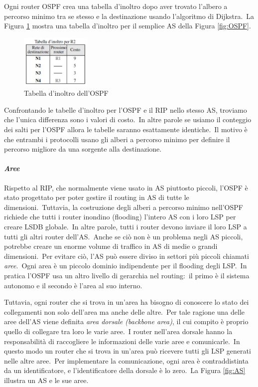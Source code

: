 Ogni router OSPF crea una tabella d'inoltro dopo aver trovato l'albero a percorso minimo tra se stesso e la destinazione usando l'algoritmo di Dijkstra.\
La Figura \ref{fig:Tabella_OSPF} mostra una tabella d'inoltro per il semplice AS della Figura \ref{fig:OSPF}.
\begin{figure}[H]
    \centering
    \includegraphics[width=0.3\textwidth]{immagini/Tabelle_inoltro_OSPF.jpg}
    \caption{Tabella d'inoltro dell'OSPF}
    \label{fig:Tabella_OSPF}
\end{figure}
Confrontando le tabelle d'inoltro per l'OSPF e il RIP nello stesso AS, troviamo che l'unica differenza sono i valori di costo.\
In altre parole se usiamo il conteggio dei salti per l'OSPF allora le tabelle saranno esattamente identiche.\
Il motivo è che entrambi i protocolli usano gli alberi a percorso minimo per definire il percorso migliore da una sorgente alla destinazione.

\paragraph{\emph{Aree}}

Rispetto al RIP, che normalmente viene usato in AS piuttosto piccoli, l'OSPF è stato progettato per poter gestire il routing in AS di tutte le dimensioni.\
Tuttavia, la costruzione degli alberi a percorso minimo nell'OSPF richiede che tutti i router inondino (flooding) l'intero AS con i loro LSP per creare LSDB globale.\
In altre parole, tutti i router devono inviare il loro LSP a tutti gli altri router dell'AS.\
Anche se ciò non è un problema negli AS piccoli, potrebbe creare un enorme volume di traffico in AS di medie o grandi dimensioni.\
Per evitare ciò, l'AS può essere diviso in settori più piccoli chiamati \emph{aree}.\
Ogni area è un piccolo dominio indipendente per il flooding degli LSP.\
In pratica l'OSPF usa un altro livello di gerarchia nel routing:\ il primo è il sistema autonomo e il secondo è l'area al suo interno.

Tuttavia, ogni router che si trova in un'area ha bisogno di conoscere lo stato dei collegamenti non solo dell'area ma anche delle altre.\
Per tale ragione una delle aree dell'AS viene definita \emph{area dorsale (backbone area)}, il cui compito è proprio quello di collegare tra loro le varie aree.\
I router nell'area dorsale hanno la responsabilità di raccogliere le informazioni delle varie aree e comunicarle.\
In questo modo un router che si trova in un'area può ricevere tutti gli LSP generati nelle altre aree.\
Per implementare la comunicazione, ogni area è contraddistinta da un identificatore, e l'identificatore della dorsale è lo zero.\
La Figura \ref{fig:AS} illustra un AS e le sue aree.

